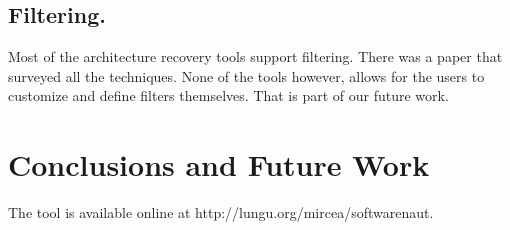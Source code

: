 \documentclass[preprint,12pt]{elsarticle}
\begin{document}
\subsection {Filtering.} Most of the architecture recovery tools support filtering. There was a paper that surveyed all the techniques. None of the tools however, allows for the users to customize and define filters themselves. That is part of our future work. 


\section {Conclusions and Future Work}
\label {sec:conc}
The tool is available online at http://lungu.org/mircea/softwarenaut.























\end{document}
